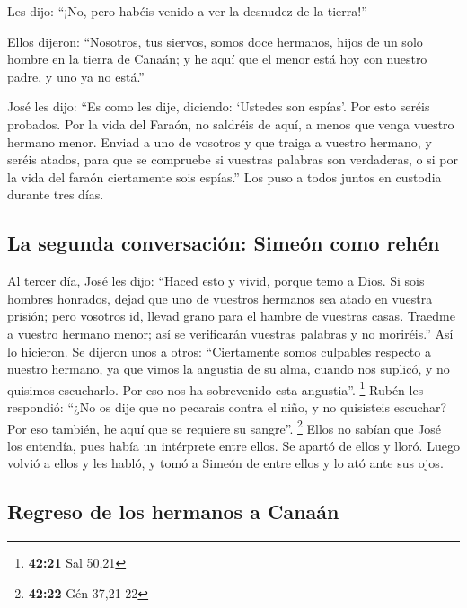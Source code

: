  Les dijo: ``¡No, pero habéis venido a ver la desnudez de
la tierra!''

 Ellos dijeron: ``Nosotros, tus siervos, somos doce
hermanos, hijos de un solo hombre en la tierra de Canaán; y he aquí que
el menor está hoy con nuestro padre, y uno ya no está.''

 José les dijo: ``Es como les dije, diciendo: `Ustedes
son espías'.  Por esto seréis probados. Por la vida del
Faraón, no saldréis de aquí, a menos que venga vuestro hermano menor.
 Enviad a uno de vosotros y que traiga a vuestro hermano,
y seréis atados, para que se compruebe si vuestras palabras son
verdaderas, o si por la vida del faraón ciertamente sois espías.''
 Los puso a todos juntos en custodia durante tres días.

\hypertarget{la-segunda-conversaciuxf3n-simeuxf3n-como-rehuxe9n}{%
\subsection{La segunda conversación: Simeón como
rehén}\label{la-segunda-conversaciuxf3n-simeuxf3n-como-rehuxe9n}}

 Al tercer día, José les dijo: ``Haced esto y vivid,
porque temo a Dios.  Si sois hombres honrados, dejad que
uno de vuestros hermanos sea atado en vuestra prisión; pero vosotros id,
llevad grano para el hambre de vuestras casas.  Traedme a
vuestro hermano menor; así se verificarán vuestras palabras y no
moriréis.'' Así lo hicieron.  Se dijeron unos a otros:
``Ciertamente somos culpables respecto a nuestro hermano, ya que vimos
la angustia de su alma, cuando nos suplicó, y no quisimos escucharlo.
Por eso nos ha sobrevenido esta angustia''. \footnote{\textbf{42:21} Sal
  50,21}  Rubén les respondió: ``¿No os dije que no
pecarais contra el niño, y no quisisteis escuchar? Por eso también, he
aquí que se requiere su sangre''. \footnote{\textbf{42:22} Gén 37,21-22}
 Ellos no sabían que José los entendía, pues había un
intérprete entre ellos.  Se apartó de ellos y lloró.
Luego volvió a ellos y les habló, y tomó a Simeón de entre ellos y lo
ató ante sus ojos.

\hypertarget{regreso-de-los-hermanos-a-canauxe1n}{%
\subsection{Regreso de los hermanos a
Canaán}\label{regreso-de-los-hermanos-a-canauxe1n}}


